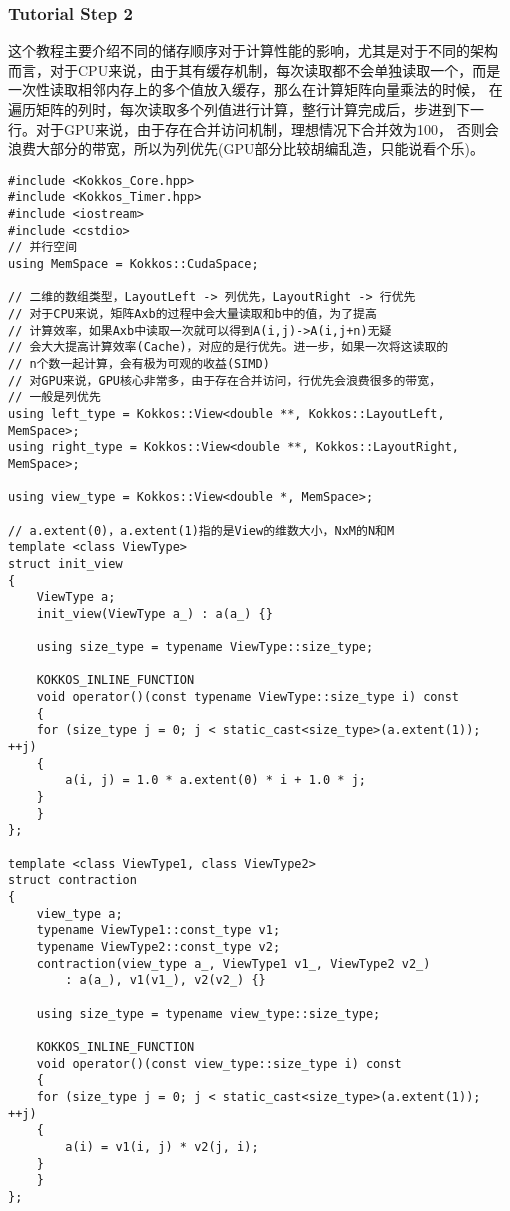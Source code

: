 \subsubsection{Tutorial Step 2}
这个教程主要介绍不同的储存顺序对于计算性能的影响，尤其是对于不同的架构
而言，对于CPU来说，由于其有缓存机制，每次读取都不会单独读取一个，而是
一次性读取相邻内存上的多个值放入缓存，那么在计算矩阵向量乘法的时候，
在遍历矩阵的列时，每次读取多个列值进行计算，整行计算完成后，步进到下一
行。对于GPU来说，由于存在合并访问机制，理想情况下合并效为100，
否则会浪费大部分的带宽，所以为列优先(GPU部分比较胡编乱造，只能说看个乐)。
\begin{lstlisting}
#include <Kokkos_Core.hpp>
#include <Kokkos_Timer.hpp>
#include <iostream>
#include <cstdio>
// 并行空间
using MemSpace = Kokkos::CudaSpace;

// 二维的数组类型，LayoutLeft -> 列优先，LayoutRight -> 行优先
// 对于CPU来说，矩阵Axb的过程中会大量读取和b中的值，为了提高
// 计算效率，如果Axb中读取一次就可以得到A(i,j)->A(i,j+n)无疑
// 会大大提高计算效率(Cache)，对应的是行优先。进一步，如果一次将这读取的
// n个数一起计算，会有极为可观的收益(SIMD) 
// 对GPU来说，GPU核心非常多，由于存在合并访问，行优先会浪费很多的带宽，
// 一般是列优先
using left_type = Kokkos::View<double **, Kokkos::LayoutLeft, MemSpace>;
using right_type = Kokkos::View<double **, Kokkos::LayoutRight, MemSpace>;

using view_type = Kokkos::View<double *, MemSpace>;

// a.extent(0)，a.extent(1)指的是View的维数大小，NxM的N和M
template <class ViewType>
struct init_view
{
    ViewType a;
    init_view(ViewType a_) : a(a_) {}

    using size_type = typename ViewType::size_type;

    KOKKOS_INLINE_FUNCTION
    void operator()(const typename ViewType::size_type i) const
    {
    for (size_type j = 0; j < static_cast<size_type>(a.extent(1)); ++j)
    {
        a(i, j) = 1.0 * a.extent(0) * i + 1.0 * j;
    }
    }
};

template <class ViewType1, class ViewType2>
struct contraction
{
    view_type a;
    typename ViewType1::const_type v1;
    typename ViewType2::const_type v2;
    contraction(view_type a_, ViewType1 v1_, ViewType2 v2_)
        : a(a_), v1(v1_), v2(v2_) {}

    using size_type = typename view_type::size_type;

    KOKKOS_INLINE_FUNCTION
    void operator()(const view_type::size_type i) const
    {
    for (size_type j = 0; j < static_cast<size_type>(a.extent(1)); ++j)
    {
        a(i) = v1(i, j) * v2(j, i);
    }
    }
};


\end{lstlisting}
